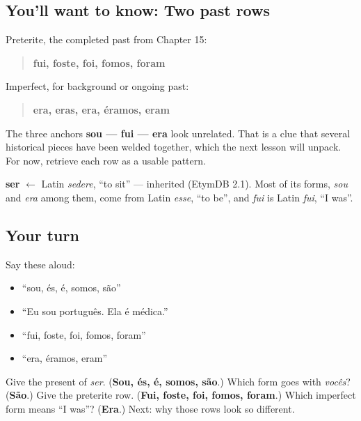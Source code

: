 \subsection*{You'll want to know: Two past rows}
Preterite, the completed past from Chapter 15:

\begin{quote}
\textbf{fui, foste, foi, fomos, foram}
\end{quote}

Imperfect, for background or ongoing past:

\begin{quote}
\textbf{era, eras, era, éramos, eram}
\end{quote}

The three anchors \textbf{sou — fui — era} look unrelated. That is a clue that several historical pieces have been welded together, which the next lesson will unpack. For now, retrieve each row as a usable pattern.

\begin{cousinweb}
\textbf{ser} $\leftarrow$ Latin \emph{sedere}, \textquotedblleft{}to sit\textquotedblright{} — inherited (EtymDB 2.1). Most of its forms, \emph{sou} and \emph{era} among them, come from Latin \emph{esse}, \textquotedblleft{}to be\textquotedblright{}, and \emph{fui} is Latin \emph{fui}, \textquotedblleft{}I was\textquotedblright{}.
\end{cousinweb}

\subsection*{Your turn}
Say these aloud:

\begin{itemize}
\raggedright
  \item “sou, és, é, somos, são”
  \item “Eu sou português. Ela é médica.”
  \item “fui, foste, foi, fomos, foram”
  \item “era, éramos, eram”
\end{itemize}

\begin{tcolorbox}[breakable,colback=teal!4,colframe=teal!35!black,title={Before you move on}]
Give the present of \emph{ser}. (\textbf{Sou, és, é, somos, são}.) Which form goes with \emph{vocês}? (\textbf{São}.) Give the preterite row. (\textbf{Fui, foste, foi, fomos, foram}.) Which imperfect form means “I was”? (\textbf{Era}.) Next: why those rows look so different.
\end{tcolorbox}
